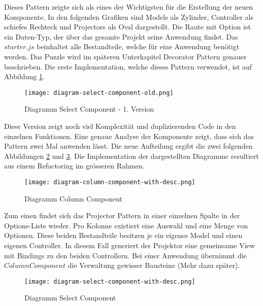 Dieses Pattern zeigte sich als eines der Wichtigsten für die Erstellung der neuen Komponente.
In den folgenden Grafiken sind Models als Zylinder, Controller als schiefes Rechteck und Projectors als Oval dargestellt.
Die Raute mit Option ist ein Daten-Typ, der über das gesamte Projekt seine Anwendung findet.
Das $starter.js$ beinhaltet alle Bestandteile, welche für eine Anwendung benötigt werden.
Das Puzzle wird im späteren Unterkapitel Decorator Pattern genauer beschrieben.
Die erste Implementation, welche dieses Pattern verwendet, ist auf Abbildung \ref{img:DiagramSelectComponentOld}.

\begin{figure}[!htb]
    \centering
    \texttt{[image: diagram-select-component-old.png]}
    \caption{Diagramm Select Component - 1. Version}
    \label{img:DiagramSelectComponentOld}
\end{figure}

Diese Version zeigt noch viel Komplexität und duplizierenden Code in den einzelnen Funktionen.
Eine genaue Analyse der Komponente zeigt, dass sich das Pattern zwei Mal anwenden lässt.
Die neue Aufteilung ergibt die zwei folgenden Abbildungen \ref{img:DiagramColumnComponent} und \ref{img:DiagramSelectComponent}.
Die Implementation der dargestellten Diagramme resultiert aus einem Refactoring im grösseren Rahmen.

\begin{figure}[!htb]
    \centering
    \texttt{[image: diagram-column-component-with-desc.png]}
    \caption{Diagramm Column Component}
    \label{img:DiagramColumnComponent}
\end{figure}

Zum einen findet sich das Projector Pattern in einer einzelnen Spalte in der Options-Liste wieder.
Pro Kolonne existiert eine Auswahl und eine Menge von Optionen.
Diese beiden Bestandteile besitzen je ein eigenes Model und einen eigenen Controller.
In diesem Fall generiert der Projektor eine gemeinsame View mit Bindings zu den beiden Controllern.
Bei einer Anwendung übernimmt die $ColumnComponent$ die Verwaltung gewisser Bausteine (Mehr dazu später).

\begin{figure}[!htb]
    \centering
    \texttt{[image: diagram-select-component-with-desc.png]}
    \caption{Diagramm Select Component}
    \label{img:DiagramSelectComponent}
\end{figure}

